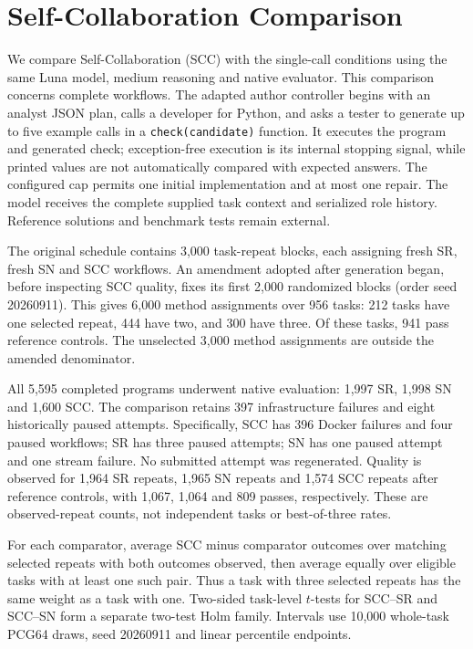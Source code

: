 \section{Self-Collaboration Comparison}
We compare Self-Collaboration (SCC) with the single-call conditions using the same Luna model, medium reasoning and native evaluator. This comparison concerns complete workflows. The adapted author controller begins with an analyst JSON plan, calls a developer for Python, and asks a tester to generate up to five example calls in a \texttt{check(candidate)} function. It executes the program and generated check; exception-free execution is its internal stopping signal, while printed values are not automatically compared with expected answers. The configured cap permits one initial implementation and at most one repair. The model receives the complete supplied task context and serialized role history. Reference solutions and benchmark tests remain external.

The original schedule contains 3,000 task-repeat blocks, each assigning fresh SR, fresh SN and SCC workflows. An amendment adopted after generation began, before inspecting SCC quality, fixes its first 2,000 randomized blocks (order seed 20260911). This gives 6,000 method assignments over 956 tasks: 212 tasks have one selected repeat, 444 have two, and 300 have three. Of these tasks, 941 pass reference controls. The unselected 3,000 method assignments are outside the amended denominator.

All 5,595 completed programs underwent native evaluation: 1,997 SR, 1,998 SN and 1,600 SCC. The comparison retains 397 infrastructure failures and eight historically paused attempts. Specifically, SCC has 396 Docker failures and four paused workflows; SR has three paused attempts; SN has one paused attempt and one stream failure. No submitted attempt was regenerated. Quality is observed for 1,964 SR repeats, 1,965 SN repeats and 1,574 SCC repeats after reference controls, with 1,067, 1,064 and 809 passes, respectively. These are observed-repeat counts, not independent tasks or best-of-three rates.

For each comparator, average SCC minus comparator outcomes over matching selected repeats with both outcomes observed, then average equally over eligible tasks with at least one such pair. Thus a task with three selected repeats has the same weight as a task with one. Two-sided task-level $t$-tests for SCC--SR and SCC--SN form a separate two-test Holm family. Intervals use 10,000 whole-task PCG64 draws, seed 20260911 and linear percentile endpoints.

